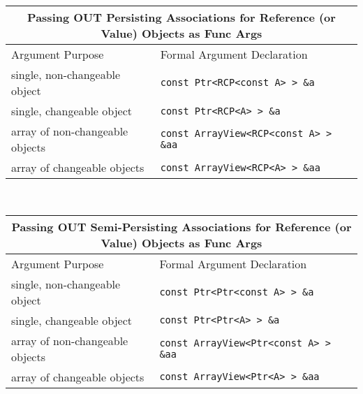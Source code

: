 \begin{tabular}{|l|l|}
%
\multicolumn{2}{c}{\textbf{Passing OUT Persisting Associations for Reference (or Value) Objects as Func Args}} \\
%
\hline
Argument Purpose
& Formal Argument Declaration \\
\hline
\hline
single, non-changeable object
& {}\texttt{const Ptr<RCP<const A> > \&a} \\
\hline
single, changeable object
& {}\texttt{const Ptr<RCP<A> > \&a} \\
\hline
array of non-changeable objects
& {}\texttt{const ArrayView<RCP<const A> > \&aa} \\
\hline
array of changeable objects
& {}\texttt{const ArrayView<RCP<A> > \&aa} \\
\hline
\end{tabular} \\[3ex]
%
\begin{tabular}{|l|l|}
%
\multicolumn{2}{c}{\textbf{Passing OUT Semi-Persisting Associations for Reference (or Value) Objects as Func Args}} \\
%
\hline
Argument Purpose
& Formal Argument Declaration \\
\hline
\hline
single, non-changeable object
& {}\texttt{const Ptr<Ptr<const A> > \&a} \\
\hline
single, changeable object
& {}\texttt{const Ptr<Ptr<A> > \&a} \\
\hline
array of non-changeable objects
& {}\texttt{const ArrayView<Ptr<const A> > \&aa} \\
\hline
array of changeable objects
& {}\texttt{const ArrayView<Ptr<A> > \&aa} \\
\hline
\end{tabular}
